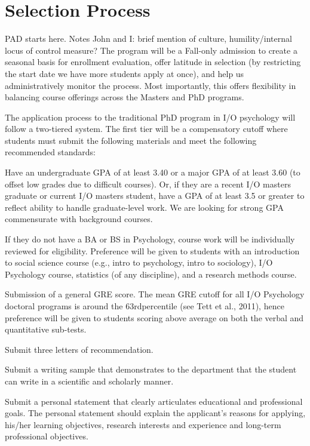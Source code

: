 \documentclass[
]{book}
\begin{document}
\hypertarget{selection-process}{%
\section{Selection Process}\label{selection-process}}

PAD starts here. Notes John and I: brief mention of culture, humility/internal locus of control measure?
The program will be a Fall-only admission to create a seasonal basis for enrollment evaluation, offer latitude in selection (by restricting the start date we have more students apply at once), and help us administratively monitor the process. Most importantly, this offers flexibility in balancing course offerings across the Masters and PhD programs.

The application process to the traditional PhD program in I/O psychology will follow a two-tiered system. The first tier will be a compensatory cutoff where students must submit the following materials and meet the following recommended standards:

Have an undergraduate GPA of at least 3.40 or a major GPA of at least 3.60 (to offset low grades due to difficult courses). Or, if they are a recent I/O masters graduate or current I/O masters student, have a GPA of at least 3.5 or greater to reflect ability to handle graduate-level work. We are looking for strong GPA commensurate with background courses.

If they do not have a BA or BS in Psychology, course work will be individually reviewed for eligibility. Preference will be given to students with an introduction to social science course (e.g., intro to psychology, intro to sociology), I/O Psychology course, statistics (of any discipline), and a research methods course.

Submission of a general GRE score. The mean GRE cutoff for all I/O Psychology doctoral programs is around the 63rdpercentile (see Tett et al., 2011), hence preference will be given to students scoring above average on both the verbal and quantitative sub-tests.

Submit three letters of recommendation.

Submit a writing sample that demonstrates to the department that the student can write in a scientific and scholarly manner.

Submit a personal statement that clearly articulates educational and professional goals. The personal statement should explain the applicant's reasons for applying, his/her learning objectives, research interests and experience and long-term professional objectives.
\end{document}

